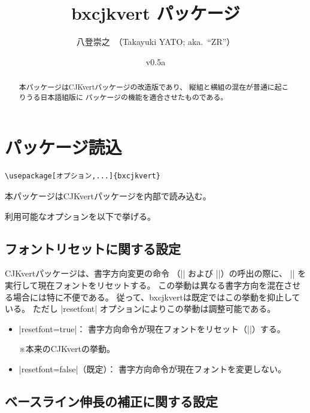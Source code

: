 \documentclass[a4paper]{ltjsarticle}
\newcommand{\PkgVersion}{0.5a}
\newcommand{\PkgDate}{2026/03/31}
\newcommand{\Pkg}[1]{\textsf{#1}}
\newcommand{\Note}{\par\noindent ※}
\newcommand{\Means}{：\quad}
\begin{document}
\title{\Pkg{bxcjkvert} パッケージ}
\author{八登崇之\ （Takayuki YATO; aka.~``ZR''）}
\date{v\PkgVersion\quad[\PkgDate]}
\maketitle

\begin{abstract}
本パッケージは\Pkg{CJKvert}パッケージの改造版であり、
縦組と横組の混在が普通に起こりうる日本語組版に
パッケージの機能を適合させたものである。
\end{abstract}

\tableofcontents

\section{パッケージ読込}
\label{sec:loading}

\begin{verbatim}
\usepackage[オプション,...]{bxcjkvert}
\end{verbatim}

本パッケージは\Pkg{CJKvert}パッケージを内部で読み込む。

利用可能なオプションを以下で挙げる。

\subsection{フォントリセットに関する設定}

\Pkg{CJKvert}パッケージは、書字方向変更の命令
（|\CJKhorz| および |\CJKvert|）の呼出の際に、
|\normalfont| を実行して現在フォントをリセットする。
この挙動は異なる書字方向を混在させる場合には特に不便である。
従って、\Pkg{bxcjkvert}は既定ではこの挙動を抑止している。
ただし |resetfont| オプションによりこの挙動は調整可能である。

\begin{itemize}
\item |resetfont=true|\Means
  書字方向命令が現在フォントをリセット（|\normalfont|）する。
  \Note 本来の\Pkg{CJKvert}の挙動。
\item |resetfont=false|（既定）\Means
  書字方向命令が現在フォントを変更しない。
\end{itemize}

\subsection{ベースライン伸長の補正に関する設定}
\end{document}
